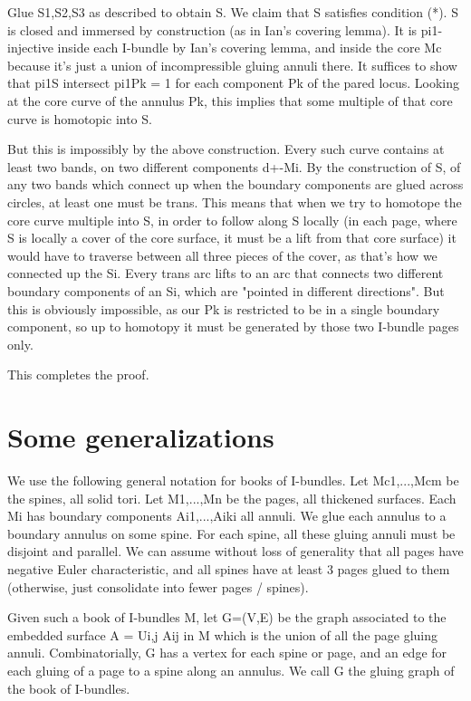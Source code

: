 \documentclass[12pt]{amsart}
\theoremstyle{definition}
\begin{document}
Glue S1,S2,S3 as described to obtain S. We claim that S satisfies condition
(*). S is closed and immersed by construction (as in Ian's covering lemma). It
is pi1-injective inside each I-bundle by Ian's covering lemma, and inside the
core Mc because it's just a union of incompressible gluing annuli there. It
suffices to show that pi1S intersect pi1Pk = 1 for each component Pk of the
pared locus. Looking at the core curve of the annulus Pk, this implies that
some multiple of that core curve is homotopic into S.

But this is impossibly by the above construction. Every such curve contains at
least two bands, on two different components d+-Mi. By the construction of S,
of any two bands which connect up when the boundary components are glued across
circles, at least one must be trans. This means that when we try to homotope
the core curve multiple into S, in order to follow along S locally (in each
page, where S is locally a cover of the core surface, it must be a lift from
that core surface) it would have to traverse between all three pieces of the
cover, as that's how we connected up the Si. Every trans arc lifts to an arc
that connects two different boundary components of an Si, which are "pointed in
different directions". But this is obviously impossible, as our Pk is
restricted to be in a single boundary component, so up to homotopy it must be
generated by those two I-bundle pages only.

This completes the proof.

\section{Some generalizations}

We use the following general notation for books of I-bundles. Let Mc1,...,Mcm
be the spines, all solid tori. Let M1,...,Mn be the pages, all thickened
surfaces. Each Mi has boundary components Ai1,...,Aiki all annuli. We glue each
annulus to a boundary annulus on some spine. For each spine, all these gluing
annuli must be disjoint and parallel. We can assume without loss of generality
that all pages have negative Euler characteristic, and all spines have at least
3 pages glued to them (otherwise, just consolidate into fewer pages / spines).

Given such a book of I-bundles M, let G=(V,E) be the graph associated to the
embedded surface A = Ui,j Aij in M which is the union of all the page gluing
annuli. Combinatorially, G has a vertex for each spine or page, and an edge for
each gluing of a page to a spine along an annulus. We call G the gluing graph
of the book of I-bundles.
\end{document}
